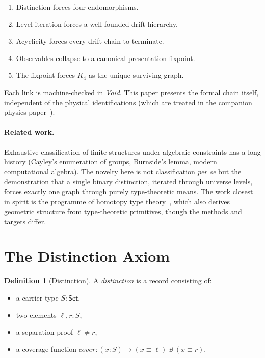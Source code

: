 \documentclass[11pt,a4paper]{article}
\theoremstyle{definition}
\newtheorem{definition}[theorem]{Definition}
\begin{document}
\begin{enumerate}[nosep]
  \item Distinction forces four endomorphisms.
  \item Level iteration forces a well-founded drift hierarchy.
  \item Acyclicity forces every drift chain to terminate.
  \item Observables collapse to a canonical presentation fixpoint.
  \item The fixpoint forces $K_4$ as the unique surviving graph.
\end{enumerate}

Each link is machine-checked in \textit{Void}.  This paper presents the
formal chain itself, independent of the physical identifications
(which are treated in the companion physics paper~\cite{wielsch2026physics}).

\paragraph{Related work.}
Exhaustive classification of finite structures under algebraic constraints
has a long history (Cayley's enumeration of groups, Burnside's lemma,
modern computational algebra).  The novelty here is not classification
\emph{per se} but the demonstration that a single binary distinction,
iterated through universe levels, forces exactly one graph through purely
type-theoretic means.  The work closest in spirit is the programme of
homotopy type theory~\cite{hottbook}, which also derives geometric
structure from type-theoretic primitives, though the methods and targets differ.

\section{The Distinction Axiom}
\label{sec:distinction}

\begin{definition}[Distinction]
A \emph{distinction} is a record consisting of:
\begin{itemize}[nosep]
  \item a carrier type $S : \mathsf{Set}$,
  \item two elements $\ell, r : S$,
  \item a separation proof $\ell \neq r$,
  \item a coverage function $\mathit{cover} : (x : S) \to (x \equiv \ell) \uplus (x \equiv r)$.
\end{itemize}
\end{definition}
\end{document}

